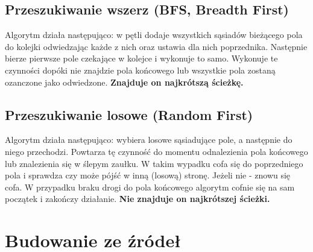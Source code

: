 \documentclass[12pt,a4paper]{article}
\begin{document}
	\subsection{Przeszukiwanie wszerz (BFS, Breadth First)}
	Algorytm działa następująco: w pętli dodaje wszystkich sąsiadów 
	bieżącego pola do kolejki odwiedzając każde z nich oraz ustawia 
	dla nich poprzednika. Następnie bierze pierwsze pole czekające w 
	kolejce i wykonuje to samo. Wykonuje te czynności dopóki nie 
	znajdzie pola końcowego lub wszystkie pola zostaną ozanczone jako 
	odwiedzone.
	\textbf{Znajduje on najkrótszą ścieżkę.}
	
	\subsection{Przeszukiwanie losowe (Random First)}
	Algorytm działa następująco: wybiera losowe sąsiadujące pole, a
	następnie do niego przechodzi. Powtarza tę czynność do momentu
	odnalezienia pola końcowego lub znalezienia się w ślepym zaułku. W 
	takim wypadku cofa się do poprzedniego pola i sprawdza czy może
	pójść w inną (losową) stronę. Jeżeli nie - znowu się cofa. W 
	przypadku braku drogi do pola końcowego algorytm cofnie się na sam 
	początek i zakończy działanie. \textbf{Nie znajduje on najkrótszej 
	ścieżki.}
	
	\section{Budowanie ze źródeł}
\end{document}
